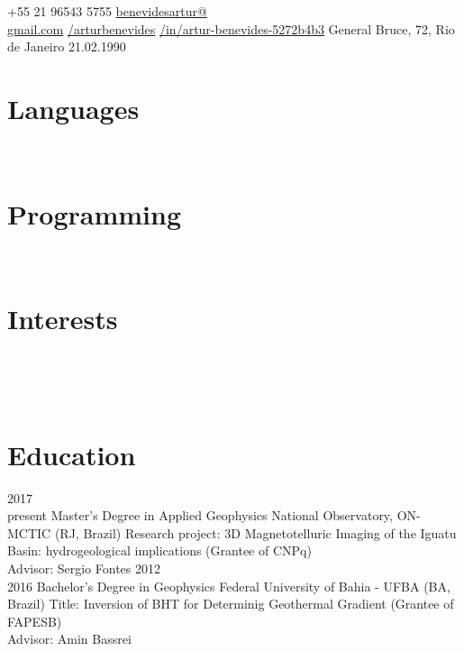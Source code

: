 \documentclass[a4paper]{my_cv}
\begin{document}
\thispagestyle{empty}	
	{+55 21 96543 5755}
 	{\href{mailto:benevidesartur@gmail.com}{benevidesartur@\\gmail.com}}
	{ \href{https://github.com/arturbenevides}{/arturbenevides}} 	
 	{ \href{https://www.linkedin.com/in/artur-benevides-5272b4b3}{/in/artur-benevides-5272b4b3}}
	{ General Bruce, 72, Rio de Janeiro }
	{21.02.1990}
	
		

 
\begin{aside}
\section{Languages}
~
\bodyfont{}
~
~
\section{Programming}
~
~
~
\section{Interests}
~
\bodyfont{}

\end {aside}
~
~\\
\section{Education}
\begin{entrylist}
  \entry
    {2017~\textemdash \\ present}
    {Master's Degree in Applied Geophysics}
    {National Observatory, ON-MCTIC (RJ, Brazil)}
    {Research project: 3D Magnetotelluric Imaging of the Iguatu Basin: hydrogeological implications (Grantee of CNPq)\\ Advisor: Sergio Fontes}
  \entry
    {2012~\textemdash \\2016}
    {Bachelor's Degree in Geophysics}
    {Federal University of Bahia - UFBA (BA, Brazil)}
    {Title: Inversion of BHT for Determinig Geothermal Gradient (Grantee of FAPESB)\\
     Advisor: Amin Bassrei}

\end{entrylist}
\end{document}
